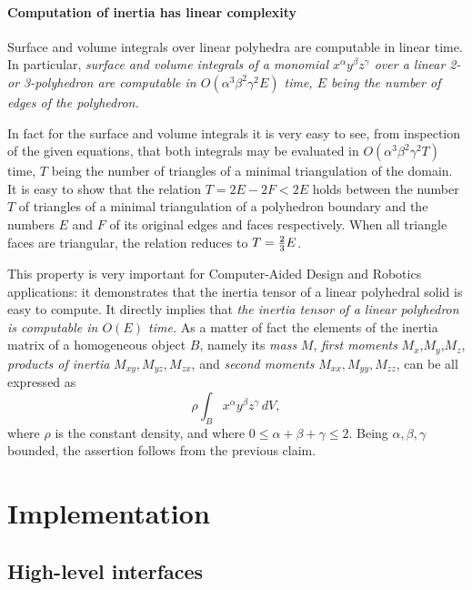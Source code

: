 \documentclass[11pt,oneside]{article}	%
\begin{document}
\paragraph{Computation of inertia has linear complexity}

Surface and volume integrals over linear polyhedra are computable in 
linear time.  In particular, \emph{surface and volume integrals of 
a monomial $x^\alpha y^\beta z^\gamma$ over a linear 2-or 3-polyhedron 
are computable in $O(\alpha^3\beta^2\gamma^2 E)$ time,  $E$ being the 
number of edges of the polyhedron.  }

In fact for the surface and volume integrals it is very easy to see, 
from inspection of the given equations, that both integrals may be 
evaluated in $O(\alpha^3\beta^2\gamma^2 T)$ time, $T$ being the number 
of triangles of a minimal triangulation of the domain.  It is easy to 
show that the relation $T=2E-2F<2E$ holds between the number $T$ of 
triangles of a minimal triangulation of a polyhedron boundary and the 
numbers $E$ and $F$ of its original edges and faces respectively.  
When all triangle faces are triangular, the relation reduces to 
$T={2\over 3} E$.  


This property is very important for Computer-Aided Design and 
Ro\-bo\-tics applications: it demonstrates that the inertia tensor of a 
linear polyhedral solid is easy to compute.  It directly implies that
\emph{the inertia tensor of a linear polyhedron is computable in $O(E)$ 
time.  } 
As a matter of fact the elements of the inertia matrix of a
homogeneous object $B$, namely its \emph{mass} $M$, \emph{first moments}
$M_x$,$M_y$,$M_z$, \emph{products of inertia} $M_{xy},M_{yz},M_{zx}$,
and \emph{second moments} $M_{xx},M_{yy},M_{zz}$, can be all expressed
as
\begin{equation}\label{31} 
\rho \int_B x^\alpha y^\beta z^\gamma \,dV,
\end{equation}
where  $\rho$
is the constant density, and where $0\le\alpha+\beta+\gamma\le
2$.  Being $\alpha,\beta,\gamma$ bounded, the assertion follows from
the previous claim.


\section{Implementation}

\subsection{High-level interfaces}
\end{document}
